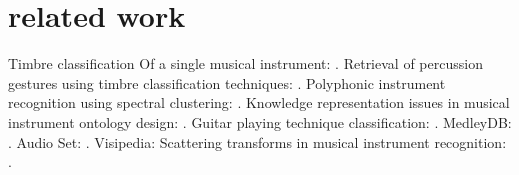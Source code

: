 \documentclass{article}
\begin{document}
\section{related work}
Timbre classification Of a single musical instrument: \cite{loureiro2004ismir}.
Retrieval of percussion gestures using timbre classification techniques: \cite{tindale2004ismir}.
Polyphonic instrument recognition using spectral clustering: \cite{martins2007ismir}.
Knowledge representation issues in musical instrument ontology design: \cite{kolozali2011ismir}.
Guitar playing technique classification: \cite{su2014ismir}.
MedleyDB: \cite{bittner2014ismir}.
Audio Set: \cite{gemmeke2017icassp}.
Visipedia: \cite{belongie2015pattern}
Scattering transforms in musical instrument recognition: \cite{tjoa2010ismir,lostanlen2017phd}.


\end{document}
